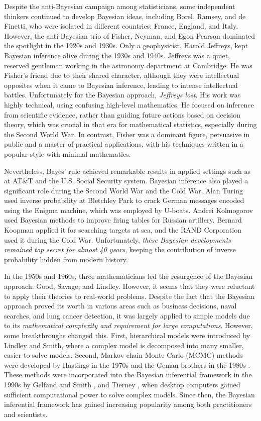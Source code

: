 Despite the anti-Bayesian campaign among statisticians, some independent thinkers continued to develop Bayesian ideas, including Borel, Ramsey, and de Finetti, who were isolated in different countries: France, England, and Italy. However, the anti-Bayesian trio of Fisher, Neyman, and Egon Pearson dominated the spotlight in the 1920s and 1930s. Only a geophysicist, Harold Jeffreys, kept Bayesian inference alive during the 1930s and 1940s. Jeffreys was a quiet, reserved gentleman working in the astronomy department at Cambridge. He was Fisher’s friend due to their shared character, although they were intellectual opposites when it came to Bayesian inference, leading to intense intellectual battles. Unfortunately for the Bayesian approach, \textit{Jeffreys lost}. His work was highly technical, using confusing high-level mathematics. He focused on inference from scientific evidence, rather than guiding future actions based on decision theory, which was crucial in that era for mathematical statistics, especially during the Second World War. In contrast, Fisher was a dominant figure, persuasive in public and a master of practical applications, with his techniques written in a popular style with minimal mathematics.

Nevertheless, Bayes' rule achieved remarkable results in applied settings such as at AT\&T and the U.S. Social Security system. Bayesian inference also played a significant role during the Second World War and the Cold War. Alan Turing used inverse probability at Bletchley Park to crack German messages encoded using the Enigma machine, which was employed by U-boats. Andrei Kolmogorov used Bayesian methods to improve firing tables for Russian artillery. Bernard Koopman applied it for searching targets at sea, and the RAND Corporation used it during the Cold War. Unfortunately, \textit{these Bayesian developments remained top secret for almost 40 years}, keeping the contribution of inverse probability hidden from modern history.

In the 1950s and 1960s, three mathematicians led the resurgence of the Bayesian approach: Good, Savage, and Lindley. However, it seems that they were reluctant to apply their theories to real-world problems. Despite the fact that the Bayesian approach proved its worth in various areas such as business decisions, naval searches, and lung cancer detection, it was largely applied to simple models due to its \textit{mathematical complexity and requirement for large computations}. However, some breakthroughs changed this. First, hierarchical models were introduced by Lindley and Smith, where a complex model is decomposed into many smaller, easier-to-solve models. Second, Markov chain Monte Carlo (MCMC) methods were developed by Hastings in the 1970s \cite{hastings70} and the Geman brothers in the 1980s \cite{Geman1984}. These methods were incorporated into the Bayesian inferential framework in the 1990s by Gelfand and Smith \cite{Gelfand1990}, and Tierney \cite{tierney1994markov}, when desktop computers gained sufficient computational power to solve complex models. Since then, the Bayesian inferential framework has gained increasing popularity among both practitioners and scientists.

